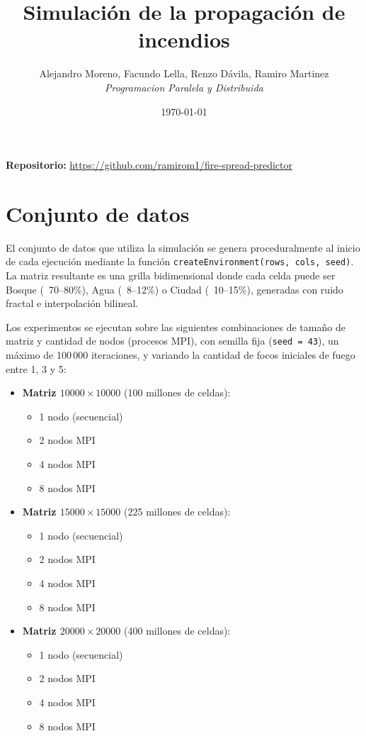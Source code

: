 \documentclass[12pt, a4paper]{article}
\title{\textbf{Simulación de la propagación de incendios}}
\author{Alejandro Moreno, Facundo Lella, Renzo Dávila, Ramiro Martinez \\ \textit{Programacion Paralela y Distribuida}}
\date{\today}
\begin{document}
\maketitle

\begin{center}
\textbf{Repositorio:} \url{https://github.com/ramirom1/fire-spread-predictor}
\end{center}

\section{Conjunto de datos}

El conjunto de datos que utiliza la simulación se genera proceduralmente al inicio de cada ejecución mediante la función \texttt{createEnvironment(rows, cols, seed)}. La matriz resultante es una grilla bidimensional donde cada celda puede ser Bosque (~70--80\%), Agua (~8--12\%) o Ciudad (~10--15\%), generadas con ruido fractal e interpolación bilineal.

Los experimentos se ejecutan sobre las siguientes combinaciones de tamaño de matriz y cantidad de nodos (procesos MPI), con semilla fija (\texttt{seed = 43}), un máximo de 100\,000 iteraciones, y variando la cantidad de focos iniciales de fuego entre 1, 3 y 5:

\begin{itemize}
    
    \item \textbf{Matriz $10000 \times 10000$} (100 millones de celdas):
    \begin{itemize}
        \item 1 nodo (secuencial)
        \item 2 nodos MPI
        \item 4 nodos MPI
        \item 8 nodos MPI
    \end{itemize}

    \item \textbf{Matriz $15000 \times 15000$} (225 millones de celdas):
    \begin{itemize}
        \item 1 nodo (secuencial)
        \item 2 nodos MPI
        \item 4 nodos MPI
        \item 8 nodos MPI
    \end{itemize}

    \item \textbf{Matriz $20000 \times 20000$} (400 millones de celdas):
    \begin{itemize}
        \item 1 nodo (secuencial)
        \item 2 nodos MPI
        \item 4 nodos MPI
        \item 8 nodos MPI
    \end{itemize}
\end{itemize}
\end{document}
